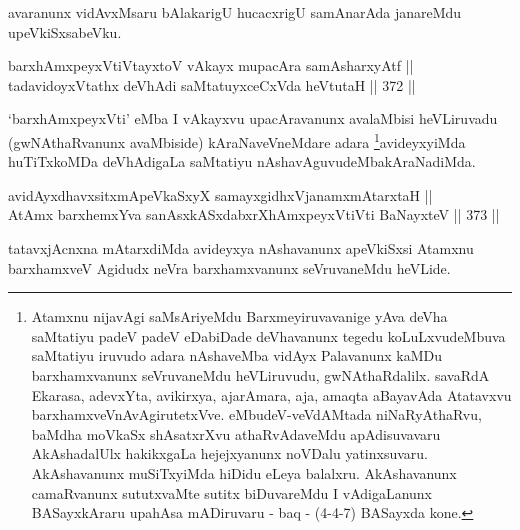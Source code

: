 \begin{artha}
avaranunx vidAvxMsaru bAlakarigU hucacxrigU samAnarAda janareMdu
upeVkiSxsabeVku.
\end{artha}


\begin{shl}
barxhAmxpeyxVtiVtayxtoV vAkayx mupacAra samAsharxyAtf || \\
tadavidoyxVtathx deVhAdi saMtatuyxceCxVda heVtutaH \hfill || 372 ||
\end{shl}


\begin{artha}
`barxhAmxpeyxVti' eMba I vAkayxvu upacAravanunx avalaMbisi heVLiruvadu (gwNAthaRvanunx avaMbiside) kAraNaveVneMdare adara \footnote{Atamxnu nijavAgi saMsAriyeMdu Barxmeyiruvavanige yAva deVha saMtatiyu padeV padeV eDabiDade deVhavanunx tegedu koLuLxvudeMbuva saMtatiyu iruvudo adara nAshaveMba vidAyx Palavanunx kaMDu barxhamxvanunx seVruvaneMdu heVLiruvudu, gwNAthaRdalilx. savaRdA Ekarasa, adevxYta, avikirxya, ajarAmara, aja, amaqta aBayavAda Atatavxvu barxhamxveVnAvAgirutetxVve. eMbudeV-\break veVdAMtada niNaRyAthaRvu, baMdha moVkaSx shAsatxrXvu athaRvAdaveMdu apAdisuvavaru AkAshadalUlx hakikxgaLa hejejxyanunx noVDalu yatinxsuvaru. AkAshavanunx muSiTxyiMda hiDidu eLeya balalxru. AkAshavanunx camaRvanunx sututxvaMte sutitx biDuvareMdu I vAdigaLanunx BASayxkAraru upahAsa mADiruvaru - baq - (4-4-7) BASayxda kone.}avideyxyiMda huTiTxkoMDa deVhAdigaLa saMtatiyu nAshavAguvudeMbakAraNadiMda.
\end{artha}




\begin{shl}
avidAyxdhavxsitxmApeVkaSxyX samayxgidhxVjanamxmAtarxtaH || \\
AtAmx barxhemxYva sanAsxkASxdabxrXhAmxpeyxVtiVti BaNayxteV \hfill || 373 ||  
\end{shl}

\begin{artha}
tatavxjAcnxna mAtarxdiMda avideyxya nAshavanunx apeVkiSxsi Atamxnu
barxhamxveV Agidudx neVra barxhamxvanunx seVruvaneMdu heVLide.
\end{artha}


